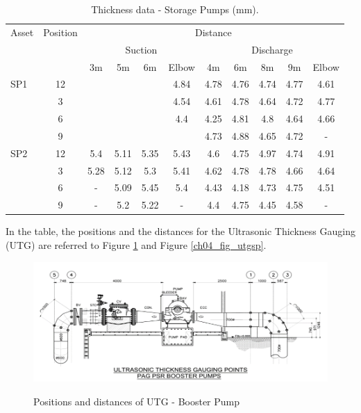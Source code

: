 \begin{table}[h]
	\caption{Thickness data - Storage Pumps (mm).}
	\label{ch04_tbl_thickness03}
	{\footnotesize
\begin{tabular}{l|c|c|c|c|c|c|c|c|l|l}
	\hline
	Asset & Position & \multicolumn{9}{c}{Distance} \\ 
	\cline{3-11}
	&  & \multicolumn{4}{c|}{Suction} & \multicolumn{5}{c}{Discharge} \\ 
	\cline{3-11}
	&  & 3m & 5m & 6m & Elbow & 4m & 6m & 8m & \multicolumn{1}{c|}{9m} & \multicolumn{1}{c}{Elbow} \\ 
	\hline
	SP1 & 12 &  &  &  & 4.84 & 4.78 & 4.76 & 4.74 & \multicolumn{1}{c|}{4.77} & \multicolumn{1}{c}{4.61} \\ 
	& 3 &  &  &  & 4.54 & 4.61 & 4.78 & 4.64 & \multicolumn{1}{c|}{4.72} & \multicolumn{1}{c}{4.77} \\ 
	& 6 &  &  &  & 4.4 & 4.25 & 4.81 & 4.8 & \multicolumn{1}{c|}{4.64} & \multicolumn{1}{c}{4.66} \\ 
	& 9 &  &  &  &  & 4.73 & 4.88 & 4.65 & \multicolumn{1}{c|}{4.72} & \multicolumn{1}{c}{-} \\ 
	\hline
	SP2 & 12 & 5.4 & 5.11 & 5.35 & 5.43 & 4.6 & 4.75 & 4.97 & \multicolumn{1}{c|}{4.74} & \multicolumn{1}{c}{4.91} \\ 
	& 3 & 5.28 & 5.12 & 5.3 & 5.41 & 4.62 & 4.78 & 4.78 & \multicolumn{1}{c|}{4.66} & \multicolumn{1}{c}{4.64} \\ 
	& 6 & - & 5.09 & 5.45 & 5.4 & 4.43 & 4.18 & 4.73 & \multicolumn{1}{c|}{4.75} & \multicolumn{1}{c}{4.51} \\ 
	& 9 & - & 5.2 & 5.22 & - & 4.4 & 4.75 & 4.45 & \multicolumn{1}{c|}{4.58} & \multicolumn{1}{c}{-} \\ 
	\hline
\end{tabular}

	}
\end{table}

In the table, the positions and the distances for the Ultrasonic Thickness Gauging (UTG) are referred to Figure \ref{ch04_fig_utgbp} and Figure \ref{ch04_fig_utgsp}.

\begin{figure}[!htb]
	\includegraphics[scale=1.3]{figures/ch04_fig_utgbp} \\
	\caption{Positions and distances of UTG - Booster Pump}
	\label{ch04_fig_utgbp} 
\end{figure}

